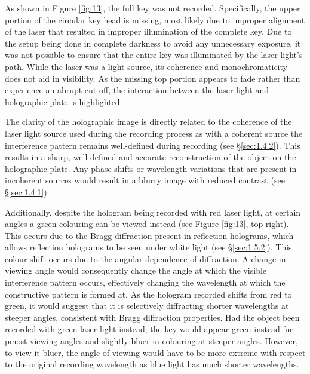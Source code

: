 \documentclass[12pt]{article}
\begin{document}
As shown in Figure \ref{fig:13}, the full key was not recorded. Specifically, the upper portion of the circular key head is missing, most likely due to improper alignment of the laser that resulted in improper illumination of the complete key.
Due to the setup being done in complete darkness to avoid any unnecessary exposure, it was not possible to ensure that the entire key was illuminated by the laser light's path. While the laser was a light source, its coherence and monochromaticity does not aid in visibility.
As the missing top portion appears to fade rather than experience an abrupt cut-off, the interaction between the laser light and holographic plate is highlighted.

The clarity of the holographic image is directly related to the coherence of the laser light source used during the recording process as with a coherent source the interference pattern remains well-defined during recording (see §\ref{sec:1.4.2}).
This results in a sharp, well-defined and accurate reconstruction of the object on the holographic plate. Any phase shifts or wavelength variations that are present in incoherent sources would result in a blurry image with reduced contrast (see §\ref{sec:1.4.1}).

Additionally, despite the hologram being recorded with red laser light, at certain angles a green colouring can be viewed instead (see Figure \ref{fig:13}, top right). This occurs due to the Bragg diffraction present in reflection holograms, which allows reflection holograms to be seen
under white light (see §\ref{sec:1.5.2}). This colour shift occurs due to the angular dependence of diffraction. A change in viewing angle would consequently change the angle at which the visible interference pattern occurs, effectively changing the wavelength at which the constructive
pattern is formed at. As the hologram recorded shifts from red to green, it would suggest that it is selectively diffracting shorter wavelengths at steeper angles, consistent with Bragg diffraction properties. Had the object been recorded with green laser light instead,
the key would appear green instead for pmost viewing angles and slightly bluer in colouring at steeper angles. However, to view it bluer, the angle of viewing would have to be more extreme with respect to the original recording wavelength as blue light has much shorter wavelengths.
\end{document}
